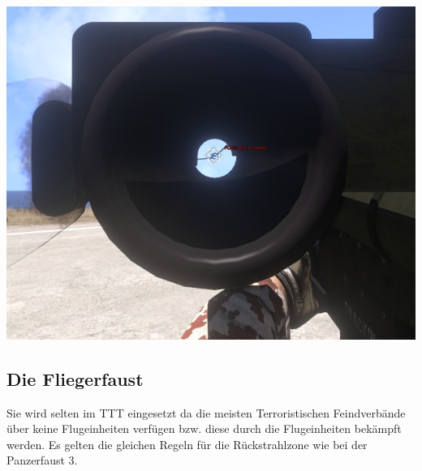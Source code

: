 \begin{minipage}[t]{1\textwidth}
	\includegraphics[width=\textwidth]{./Grafiken/Abschnitt/Fliegerfaust_Visier.png}
\end{minipage}

\subsection{Die Fliegerfaust}
	Sie wird selten im \ac{TTT} eingesetzt da die meisten Terroristischen Feindverbände über keine Flugeinheiten verfügen bzw. diese durch die Flugeinheiten bekämpft werden. Es gelten die gleichen Regeln für die Rückstrahlzone wie bei der Panzerfaust 3.\\

